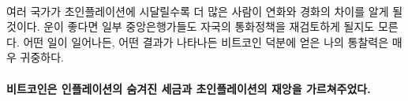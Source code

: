 \paragraph{}
\begin{comment}
	As more and more countries suffer from
	hyperinflation more and more people will have to face the reality
	of hard and soft money. If we are lucky, maybe even some central bankers will be
	forced to re-evaluate their monetary policies. Whatever might happen, the
	insights I have gained thanks to Bitcoin will probably be invaluable, no matter
	the outcome.
\end{comment}
여러 국가가 초인플레이션에 시달릴수록 더 많은 사람이 연화와 경화의 차이를 알게 될 것이다. 
운이 좋다면 일부 중앙은행가들도 자국의 통화정책을 재검토하게 될지도 모른다. 
어떤 일이 일어나든, 어떤 결과가 나타나든
비트코인 덕분에 얻은 나의 통찰력은 매우 귀중하다.

\paragraph{비트코인은 인플레이션의 숨겨진 세금과 초인플레이션의 재앙을 가르쳐주었다.}

%
%
%
%
%

